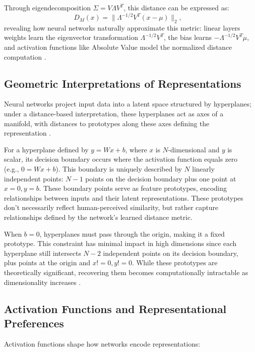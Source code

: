 Through eigendecomposition $\Sigma = V\Lambda V^T$, this distance can be expressed as:
\begin{equation}
    D_M(x) = \| \Lambda^{-1/2} V^T (x - \mu) \|_2,
\end{equation}
revealing how neural networks naturally approximate this metric: linear layers weights learn the eigenvector transformation $\Lambda^{-1/2} V^T$, the bias learns $-\Lambda^{-1/2} V^T \mu$, and activation functions like Absolute Value model the normalized distance computation \cite{oursland2024interpreting}.

\subsection{Geometric Interpretations of Representations}

Neural networks project input data into a latent space structured by hyperplanes; under a distance-based interpretation, these hyperplanes act as axes of a manifold, with distances to prototypes along these axes defining the representation \cite{montavon2018methods}.

For a hyperplane defined by $y = Wx + b$, where $x$ is $N$-dimensional and $y$ is scalar, its decision boundary occurs where the activation function equals zero (e.g., $0 = Wx + b$). This boundary is uniquely described by $N$ linearly independent points: $N-1$ points on the decision boundary plus one point at ${x=0, y=b}$. These boundary points serve as feature prototypes, encoding relationships between inputs and their latent representations. These prototypes don't necessarily reflect human-perceived similarity, but rather capture relationships defined by the network's learned distance metric.

When $b=0$, hyperplanes must pass through the origin, making it a fixed prototype. This constraint has minimal impact in high dimensions since each hyperplane still intersects $N-2$ independent points on its decision boundary, plus points at the origin and ${x!=0, y!=0}$. While these prototypes are theoretically significant, recovering them becomes computationally intractable as dimensionality increases \cite{donoho2000high}.

\subsection{Activation Functions and Representational Preferences}

Activation functions shape how networks encode representations:

